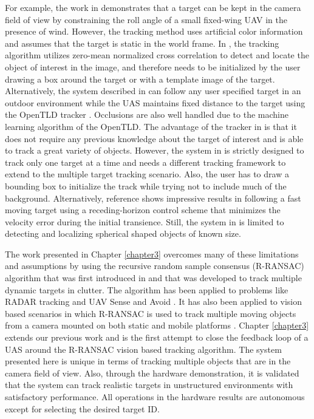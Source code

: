 For example, the work in \cite{Saunders2011} demonstrates that a target can be kept in the camera field of view by constraining the roll angle of a small fixed-wing UAV in the presence of wind. However, the tracking method uses artificial color information and assumes that the target is static in the world frame. In \cite{Qadir2011}, the tracking algorithm utilizes zero-mean normalized cross correlation to detect and locate the object of interest in the image, and therefore needs to be initialized by the user drawing a box around the target or with a template image of the target. Alternatively, the system described in \cite{Pestana2013} can follow any user specified target in an outdoor environment while the UAS maintains fixed distance to the target using the OpenTLD tracker \cite{Kalal2012}. Occlusions are also well handled due to the machine learning algorithm of the OpenTLD. The advantage of the tracker in \cite{Kalal2012} is that it does not require any previous knowledge about the target of interest and is able to track a great variety of objects. However, the system in \cite{Pestana2013} is strictly designed to track only one target at a time and needs a different tracking framework to extend to the multiple target tracking scenario. Also, the user has to draw a bounding box to initialize the track while trying not to include much of the background. Alternatively, reference \cite{Thomas2017} shows impressive results in following a fast moving target using a receding-horizon control scheme that minimizes the velocity error during the initial transience. Still, the system in \cite{Thomas2017} is limited to detecting and localizing spherical shaped objects of known size. 

The work presented in Chapter \ref{chapter3} overcomes many of these limitations and assumptions by using the recursive random sample consensus (R-RANSAC) algorithm that was first introduced in \cite{Niedfeldt2014} and that was developed to track multiple dynamic targets in clutter. The algorithm has been applied to problems like RADAR tracking \cite{Quist2016, Niedfeldt2014} and UAV Sense and Avoid \cite{Wikle2012}. It has also been applied to vision based scenarios in which R-RANSAC is used to track multiple moving objects from a camera mounted on both static and mobile platforms \cite{Ingersoll2015, Defranco2015}. Chapter \ref{chapter3} extends our previous work and is the first attempt to close the feedback loop of a UAS around the R-RANSAC vision based tracking algorithm. The system presented here is unique in terms of tracking multiple objects that are in the camera field of view. Also, through the hardware demonstration, it is validated that the system can track realistic targets in unstructured environments with satisfactory performance. All operations in the hardware results are autonomous except for selecting the desired target ID.

